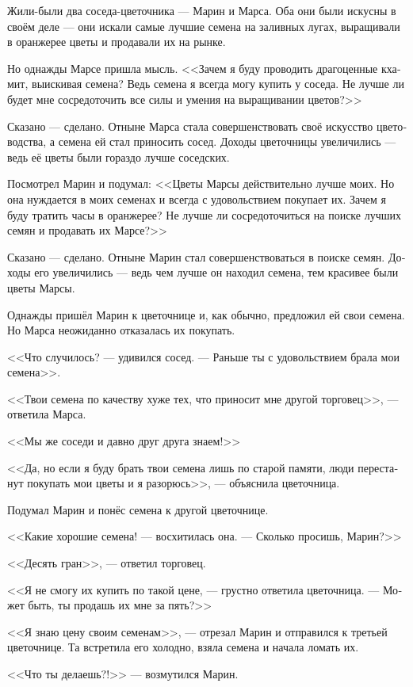 \documentclass[a4paper,12pt,fleqn]{book}\usepackage{cooltooltips}\usepackage{polyglossia}\setdefaultlanguage[babelshorthands=true]{russian}\setotherlanguage{english}\defaultfontfeatures{Ligatures=TeX,Mapping=tex-text} \usepackage{xcolor}\definecolor{lightgray}{HTML}{bbbbbb}\color{lightgray}\newcommand{\ml}[3]{\textenglish{\textcolor{black}{#3}}}
\begin{document}
{Жили-были два соседа-цветочника --- Марин и Марса.
Оба они были искусны в своём деле --- они искали самые лучшие семена на заливных лугах, выращивали в оранжерее цветы и продавали их на рынке.

Но однажды Марсе пришла мысль.
<<Зачем я буду проводить драгоценные кхамит, выискивая семена?
Ведь семена я всегда могу купить у соседа.
Не лучше ли будет мне сосредоточить все силы и умения на выращивании цветов?>>

Сказано --- сделано.
Отныне Марса стала совершенствовать своё искусство цветоводства, а семена ей стал приносить сосед.
Доходы цветочницы увеличились --- ведь её цветы были гораздо лучше соседских.

Посмотрел Марин и подумал: <<Цветы Марсы действительно лучше моих.
Но она нуждается в моих семенах и всегда с удовольствием покупает их.
Зачем я буду тратить часы в оранжерее?
Не лучше ли сосредоточиться на поиске лучших семян и продавать их Марсе?>>

Сказано --- сделано.
Отныне Марин стал совершенствоваться в поиске семян.
Доходы его увеличились --- ведь чем лучше он находил семена, тем красивее были цветы Марсы.

Однажды пришёл Марин к цветочнице и, как обычно, предложил ей свои семена.
Но Марса неожиданно отказалась их покупать.

<<Что случилось? --- удивился сосед.
--- Раньше ты с удовольствием брала мои семена>>.

<<Твои семена по качеству хуже тех, что приносит мне другой торговец>>, --- ответила Марса.

<<Мы же соседи и давно друг друга знаем!>>

<<Да, но если я буду брать твои семена лишь по старой памяти, люди перестанут покупать мои цветы и я разорюсь>>, --- объяснила цветочница.

Подумал Марин и понёс семена к другой цветочнице.

<<Какие хорошие семена! --- восхитилась она.
--- Сколько просишь, Марин?>>

<<Десять гран>>, --- ответил торговец.

<<Я не смогу их купить по такой цене, --- грустно ответила цветочница.
--- Может быть, ты продашь их мне за пять?>>

<<Я знаю цену своим семенам>>, --- отрезал Марин и отправился к третьей цветочнице.
Та встретила его холодно, взяла семена и начала ломать их.

<<Что ты делаешь?!>> --- возмутился Марин.

}
\end{document}

